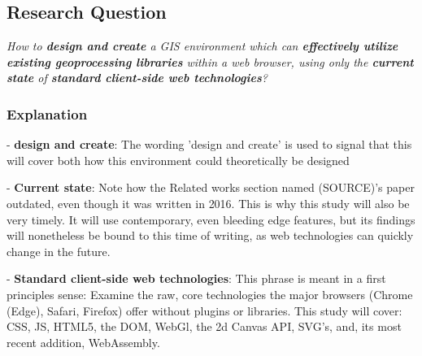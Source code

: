 

\subsection{Research Question}

\textit{How to \textbf{design and create} a GIS environment which can \textbf{effectively utilize} \textbf{existing geoprocessing libraries} within a web browser, using only the \textbf{current state} of \textbf{standard client-side web technologies}?}


\subsubsection*{Explanation}


- \textbf{design and create}: The wording 'design and create' is used to signal that this will cover both how this environment could theoretically be designed

- \textbf{Current state}: Note how the Related works section named (SOURCE)'s paper outdated, even though it was written in 2016. This is why this study will also be very timely. It will use contemporary, even bleeding edge features, but its findings will nonetheless be bound to this time of writing, as web technologies can quickly change in the future. 

- \textbf{Standard client-side web technologies}: This phrase is meant in a first principles sense: Examine the raw, core technologies the major browsers (Chrome (Edge), Safari, Firefox) offer without plugins or libraries. This study will cover: CSS, JS, HTML5, the DOM, WebGl, the 2d Canvas API, SVG's, and, its most recent addition, WebAssembly. 

